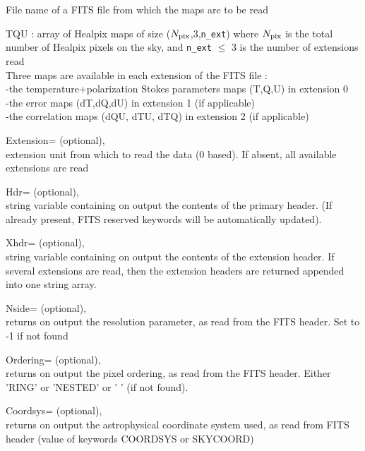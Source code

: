 \begin{qualifiers}
  \begin{qulist}{} %
 	\item[{File}] 
          name of a FITS file from which the maps are to be read

   \item[{TQU}] : array of Healpix maps of size ($N_{\rm pix}$,3,{\tt n\_ext}) where $N_{\rm pix}$ is the total
   number of Healpix pixels on the sky, and {\tt n\_ext} $\le$ 3 is
   the number of extensions read\\
     Three maps are available in each extension of the FITS file : \\
      -the temperature+polarization Stokes parameters maps (T,Q,U) in
   extension 0 \\
      -the error maps (dT,dQ,dU) in extension 1 (if applicable)\\
      -the correlation maps (dQU, dTU, dTQ) in extension 2 (if applicable)

       \item[{Extension=}]
		(optional), \\
	extension unit from which to read the data (0 based). 
	If absent, all available extensions are read

       \item[{Hdr=}]
		  (optional), \\
		string variable containing on output  the contents of the primary header. (If already present, FITS reserved
		  keywords will be automatically updated).

       \item[{Xhdr=}]
		  (optional), \\
		string variable containing on output the contents of the
		  extension header. If 
                  several extensions are read, then the extension 
                  headers are returned appended into one string array.

	 \item[{Nside=}]
		(optional), \\
	        returns on output the \healpix resolution parameter, as read
		from the FITS header. Set to -1 if not found

	 \item[{Ordering=}]
	        (optional), \\
	        returns on output the pixel ordering, as read from the FITS
	        header. Either 'RING' or 'NESTED' or ' ' (if not found).

	 \item[{Coordsys=}]
	        (optional), \\
	        returns on output the astrophysical coordinate system used, 
		as read from FITS header (value of keywords COORDSYS or SKYCOORD)

  \end{qulist}
\end{qualifiers}

